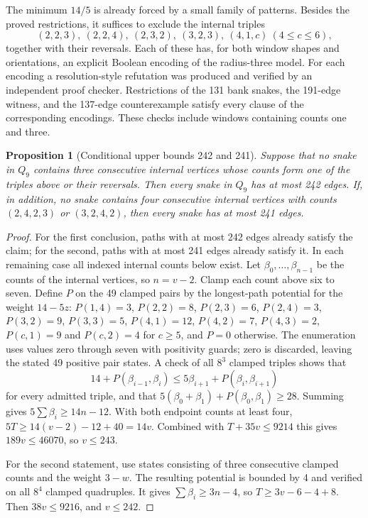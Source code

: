 \documentclass[11pt,a4paper]{article}
\newtheorem{proposition}[theorem]{Proposition}
\theoremstyle{definition}
\theoremstyle{remark}
\newcommand{\Q}{Q}
\begin{document}
The minimum $14/5$ is already forced by a small family of patterns. Besides the proved restrictions, it suffices to exclude the internal triples
\[
(2,2,3),\ (2,2,4),\ (2,3,2),\ (3,2,3),\ (4,1,c)\ (4\le c\le6),
\]
together with their reversals. Each of these has, for both window shapes and orientations, an explicit Boolean encoding of the radius-three model. For each encoding a resolution-style refutation was produced and verified by an independent proof checker. Restrictions of the 131 bank snakes, the 191-edge witness, and the 137-edge counterexample satisfy every clause of the corresponding encodings. These checks include windows containing counts one and three.

\begin{proposition}[Conditional upper bounds 242 and 241]\label{prop:window-aggregate}
Suppose that no snake in $\Q_9$ contains three consecutive internal vertices whose counts form one of the triples above or their reversals. Then every snake in $\Q_9$ has at most 242 edges. If, in addition, no snake contains four consecutive internal vertices with counts $(2,4,2,3)$ or $(3,2,4,2)$, then every snake has at most 241 edges.
\end{proposition}
\begin{proof}
For the first conclusion, paths with at most 242 edges already satisfy the claim; for the second, paths with at most 241 edges already satisfy it. In each remaining case all indexed internal counts below exist.
Let $\beta_0,\ldots,\beta_{n-1}$ be the counts of the internal vertices, so $n=v-2$. Clamp each count above six to seven. Define $P$ on the 49 clamped pairs by the longest-path potential for the weight $14-5z$:
$P(1,4)=3$, $P(2,2)=8$, $P(2,3)=6$, $P(2,4)=3$, $P(3,2)=9$, $P(3,3)=5$, $P(4,1)=12$, $P(4,2)=7$, $P(4,3)=2$, $P(c,1)=9$ and $P(c,2)=4$ for $c\ge5$, and $P=0$ otherwise. The enumeration uses values zero through seven with positivity guards;
zero is discarded, leaving the stated 49 positive pair states.
A check of all $8^3$ clamped triples shows that
\[
14+P(\beta_{i-1},\beta_i)\le5\beta_{i+1}+P(\beta_i,\beta_{i+1})
\]
for every admitted triple, and that $5(\beta_0+\beta_1)+P(\beta_0,\beta_1)\ge28$. Summing gives $5\sum\beta_i\ge14n-12$. With both endpoint counts at least four, $5T\ge14(v-2)-12+40=14v$. Combined with $T+35v\le9214$ this gives $189v\le46070$, so $v\le243$.

For the second statement, use states consisting of three consecutive clamped counts and the weight $3-w$. The resulting potential is bounded by 4 and verified on all $8^4$ clamped quadruples. It gives $\sum\beta_i\ge3n-4$, so $T\ge3v-6-4+8$. Then $38v\le9216$, and $v\le242$.
\end{proof}
\end{document}
